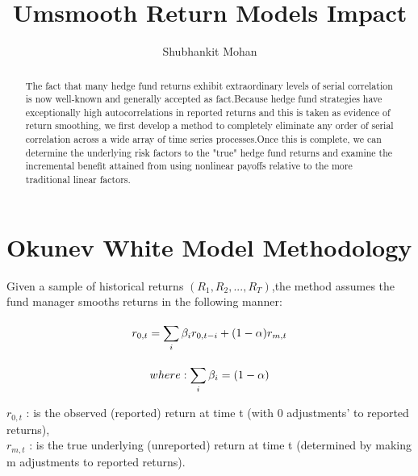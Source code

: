 \documentclass[12pt,letterpaper,english]{article}
\title{Umsmooth Return Models Impact}
\author{Shubhankit Mohan}
\begin{document}


\maketitle


\begin{abstract}
The fact that many hedge fund returns exhibit extraordinary levels of serial correlation is now well-known and generally accepted as fact.Because hedge fund strategies have exceptionally high autocorrelations in reported returns and this is taken as evidence of return smoothing, we first develop a method to completely eliminate any order of serial correlation across a wide array of time series processes.Once this is complete, we can determine the underlying risk factors to the "true" hedge fund returns and examine the incremental benefit attained from using nonlinear payoffs relative to the more traditional linear factors.
\end{abstract}
\tableofcontents




\section{Okunev White Model Methodology}
Given a sample of historical returns \((R_1,R_2, . . .,R_T)\),the method assumes the fund manager smooths returns in the following manner:

  
\begin{equation}
 r_{0,t}  =  \sum_{i}^{} \beta_{i}r_{0,t-i} + (1- \alpha)r_{m,t} \\
\end{equation}


\begin{equation}
where :  \sum_{i}^{} \beta_{i} = (1- \alpha) \\
\end{equation}

\(r_{0,t}\) : is the observed (reported) return at time t (with 0 adjustments' to reported returns), \\
\(r_{m,t}\) : is the true underlying (unreported) return at time t (determined by making m adjustments to reported returns). \\
\end{document}
